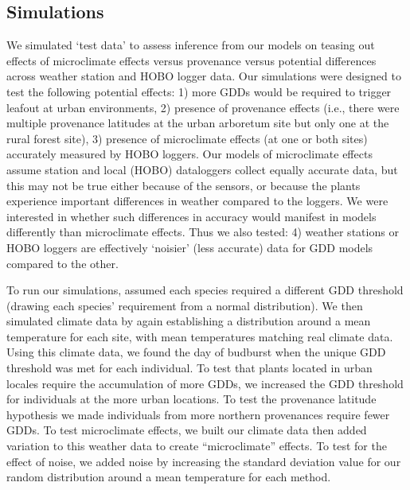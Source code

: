 \documentclass{article}\usepackage[]{graphicx}\usepackage[]{color}
\begin{document}
\subsection{Simulations}
We simulated `test data' \citep[sometimes referred to as `artificial data,' see][]{Hunter1992} to assess inference from our models on teasing out effects of microclimate effects versus provenance versus potential differences across weather station and HOBO logger data. Our simulations were designed to test the following potential effects: 1) more GDDs would be required to trigger leafout at urban environments, 2) presence of provenance effects (i.e., there were multiple provenance latitudes at the urban arboretum site but only one at the rural forest site), 3) presence of microclimate effects (at one or both sites) accurately measured by HOBO loggers. Our models of microclimate effects assume station and local (HOBO) dataloggers collect equally accurate data, but this may not be true either because of the sensors, or because the plants experience important differences in weather compared to the loggers. We were interested in whether such differences in accuracy would manifest in models differently than microclimate effects. Thus we also tested: 4) weather stations or HOBO loggers are effectively `noisier' (less accurate) data for GDD models compared to the other. 

To run our simulations, assumed each species required a different GDD threshold (drawing each species' requirement from a normal distribution). We then simulated climate data by again establishing a distribution around a mean temperature for each site, with mean temperatures matching real climate data. Using this climate data, we found the day of budburst when the unique GDD threshold was met for each individual. To test that plants located in urban locales require the accumulation of more GDDs, we increased the GDD threshold for individuals at the more urban locations. To test the provenance latitude hypothesis we made individuals from more northern provenances require fewer GDDs. To test microclimate effects, we built our climate data then added variation to this weather data to create ``microclimate'' effects.  To test for the effect of noise, we added noise by increasing the standard deviation value for our random distribution around a mean temperature for each method.
\end{document}
